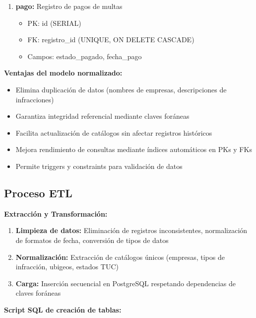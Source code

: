 \documentclass[12pt,a4paper]{article}
\begin{document}
\begin{enumerate}
    \item \textbf{pago:} Registro de pagos de multas
    \begin{itemize}
        \item PK: id (SERIAL)
        \item FK: registro\_id (UNIQUE, ON DELETE CASCADE)
        \item Campos: estado\_pagado, fecha\_pago
    \end{itemize}
\end{enumerate}

\textbf{Ventajas del modelo normalizado:}

\begin{itemize}
    \item Elimina duplicación de datos (nombres de empresas, descripciones de infracciones)
    \item Garantiza integridad referencial mediante claves foráneas
    \item Facilita actualización de catálogos sin afectar registros históricos
    \item Mejora rendimiento de consultas mediante índices automáticos en PKs y FKs
    \item Permite triggers y constraints para validación de datos
\end{itemize}

\subsection{Proceso ETL}

\textbf{Extracción y Transformación:}

\begin{enumerate}
    \item \textbf{Limpieza de datos:} Eliminación de registros inconsistentes, normalización de formatos de fecha, conversión de tipos de datos
    \item \textbf{Normalización:} Extracción de catálogos únicos (empresas, tipos de infracción, ubigeos, estados TUC)
    \item \textbf{Carga:} Inserción secuencial en PostgreSQL respetando dependencias de claves foráneas
\end{enumerate}

\textbf{Script SQL de creación de tablas:}
\end{document}
